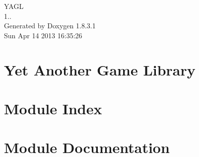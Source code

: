 \documentclass{book}
\begin{document}
\hypersetup{pageanchor=false,citecolor=blue}
\begin{titlepage}
\vspace*{7cm}
\begin{center}
{\Large Y\-A\-G\-L \\[1ex]\large 1.. }\\
\vspace*{1cm}
{\large Generated by Doxygen 1.8.3.1}\\
\vspace*{0.5cm}
{\small Sun Apr 14 2013 16:35:26}\\
\end{center}
\end{titlepage}
\clearemptydoublepage
{}
\tableofcontents
\clearemptydoublepage
{}
\hypersetup{pageanchor=true,citecolor=blue}
\chapter{Yet Another Game Library}
\label{index}\hypertarget{index}{}
\chapter{Module Index}

\chapter{Module Documentation}





























\printindex
\end{document}
